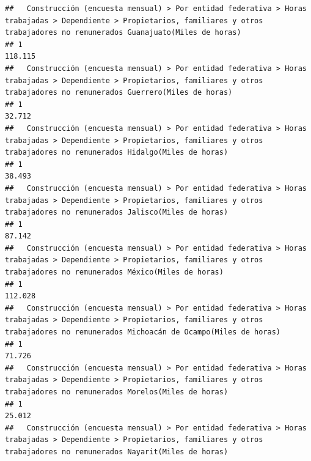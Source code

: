 \documentclass[
]{article}
\begin{document}
\begin{verbatim}
##   Construcción (encuesta mensual) > Por entidad federativa > Horas trabajadas > Dependiente > Propietarios, familiares y otros trabajadores no remunerados Guanajuato(Miles de horas) 
## 1                                                                                                                                                                              118.115
##   Construcción (encuesta mensual) > Por entidad federativa > Horas trabajadas > Dependiente > Propietarios, familiares y otros trabajadores no remunerados Guerrero(Miles de horas) 
## 1                                                                                                                                                                             32.712
##   Construcción (encuesta mensual) > Por entidad federativa > Horas trabajadas > Dependiente > Propietarios, familiares y otros trabajadores no remunerados Hidalgo(Miles de horas) 
## 1                                                                                                                                                                            38.493
##   Construcción (encuesta mensual) > Por entidad federativa > Horas trabajadas > Dependiente > Propietarios, familiares y otros trabajadores no remunerados Jalisco(Miles de horas) 
## 1                                                                                                                                                                            87.142
##   Construcción (encuesta mensual) > Por entidad federativa > Horas trabajadas > Dependiente > Propietarios, familiares y otros trabajadores no remunerados México(Miles de horas) 
## 1                                                                                                                                                                          112.028
##   Construcción (encuesta mensual) > Por entidad federativa > Horas trabajadas > Dependiente > Propietarios, familiares y otros trabajadores no remunerados Michoacán de Ocampo(Miles de horas) 
## 1                                                                                                                                                                                        71.726
##   Construcción (encuesta mensual) > Por entidad federativa > Horas trabajadas > Dependiente > Propietarios, familiares y otros trabajadores no remunerados Morelos(Miles de horas) 
## 1                                                                                                                                                                            25.012
##   Construcción (encuesta mensual) > Por entidad federativa > Horas trabajadas > Dependiente > Propietarios, familiares y otros trabajadores no remunerados Nayarit(Miles de horas) 

\end{verbatim}
\end{document}
